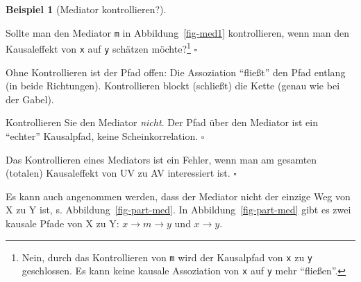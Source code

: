 \documentclass[
  ngerman,
  letterpaper,
  twoside,
  open=any]{scrbook}
\theoremstyle{definition}
\newtheorem{example}{Beispiel}[chapter]
\theoremstyle{plain}
\theoremstyle{definition}
\theoremstyle{definition}
\theoremstyle{definition}
\newtheorem{example}{Beispiel}[chapter]
\theoremstyle{definition}
\theoremstyle{remark}
\begin{document}
\begin{example}[Mediator
kontrollieren?]\protect\hypertarget{exm-mediator}{}\label{exm-mediator}

Sollte man den Mediator \texttt{m} in Abbildung~\ref{fig-med1}
kontrollieren, wenn man den Kausaleffekt von \texttt{x} auf \texttt{y}
schätzen möchte?\footnote{Nein, durch das Kontrollieren von \texttt{m}
  wird der Kausalpfad von \texttt{x} zu \texttt{y} geschlossen. Es kann
  keine kausale Assoziation von \texttt{x} auf \texttt{y} mehr
  \enquote{fließen}.} \(\square\)

\end{example}

Ohne Kontrollieren ist der Pfad offen: Die Assoziation \enquote{fließt}
den Pfad entlang (in beide Richtungen). Kontrollieren blockt (schließt)
die Kette (genau wie bei der Gabel).

\begin{tcolorbox}[enhanced jigsaw, arc=.35mm, bottomrule=.15mm, bottomtitle=1mm, breakable, colback=white, colbacktitle=quarto-callout-tip-color!10!white, colframe=quarto-callout-tip-color-frame, coltitle=black, left=2mm, leftrule=.75mm, opacityback=0, opacitybacktitle=0.6, rightrule=.15mm, title=\textcolor{quarto-callout-tip-color}{\faLightbulb}\hspace{0.5em}{Tipp}, titlerule=0mm, toprule=.15mm, toptitle=1mm]

Kontrollieren Sie den Mediator \emph{nicht}. Der Pfad über den Mediator
ist ein \enquote{echter} Kausalpfad, keine Scheinkorrelation.
\(\square\)

\end{tcolorbox}

\begin{tcolorbox}[enhanced jigsaw, arc=.35mm, bottomrule=.15mm, bottomtitle=1mm, breakable, colback=white, colbacktitle=quarto-callout-important-color!10!white, colframe=quarto-callout-important-color-frame, coltitle=black, left=2mm, leftrule=.75mm, opacityback=0, opacitybacktitle=0.6, rightrule=.15mm, title=\textcolor{quarto-callout-important-color}{\faExclamation}\hspace{0.5em}{Wichtig}, titlerule=0mm, toprule=.15mm, toptitle=1mm]

Das Kontrollieren eines Mediators ist ein Fehler, wenn man am gesamten
(totalen) Kausaleffekt von UV zu AV interessiert ist. \(\square\)

\end{tcolorbox}

Es kann auch angenommen werden, dass der Mediator nicht der einzige Weg
von X zu Y ist, s. Abbildung~\ref{fig-part-med}. In
Abbildung~\ref{fig-part-med} gibt es zwei kausale Pfade von X zu Y:
\(x\rightarrow m \rightarrow y\) und \(x \rightarrow y\).
\end{document}
